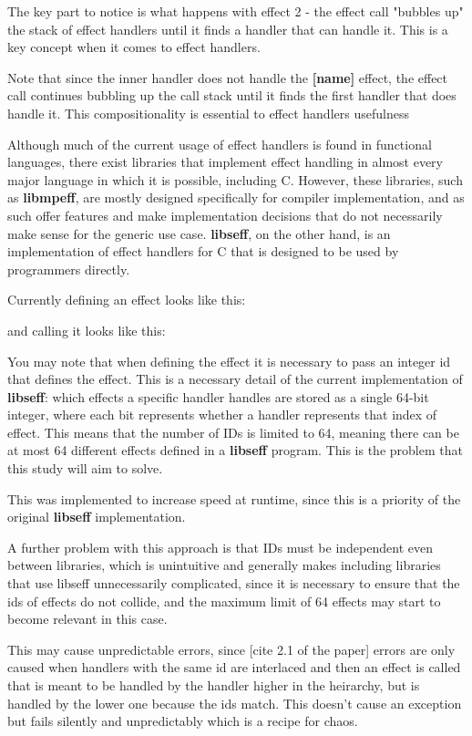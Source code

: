 \documentclass{article}
\begin{document}
The key part to notice is what happens with effect 2 - the effect call "bubbles up" the stack of effect handlers until it finds a handler that can handle it. This is a key concept when it comes to effect handlers.

Note that since the inner handler does not handle the \textbf{[name]} effect, the effect call continues bubbling up the call stack until it finds the first handler that does handle it. This compositionality is essential to effect handlers usefulness %









Although much of the current usage of effect handlers is found in functional languages, there exist libraries that implement effect handling in almost every major language in which it is possible, including C. However, these libraries, such as \textbf{libmpeff}, are mostly designed specifically for compiler implementation, and as such offer features and make implementation decisions that do not necessarily make sense for the generic use case.\cite{libmprompt} \textbf{libseff}, on the other hand, is an implementation of effect handlers for C that is designed to be used by programmers directly.\cite{libseff_paper}

Currently defining an effect looks like this: %

and calling it looks like this: %

You may note that when defining the effect it is necessary to pass an integer id that defines the effect. This is a necessary detail of the current implementation of \textbf{libseff}: which effects a specific handler handles are stored as a single 64-bit integer, where each bit represents whether a handler represents that index of effect. This means that the number of IDs is limited to 64, meaning there can be at most 64 different  effects defined in a \textbf{libseff} program. This is the problem that this study will aim to solve.

This was implemented to increase speed at runtime, since this is a priority of the original \textbf{libseff} implementation. %

A further problem with this approach is that IDs must be independent even between libraries, which is unintuitive and generally makes including libraries that use libseff unnecessarily complicated, since it is necessary to ensure that the ids of effects do not collide, and the maximum limit of 64 effects may start to become relevant in this case.

This may cause unpredictable errors, since [cite 2.1 of the paper] errors are only caused when handlers with the same id are interlaced and then an effect is called that is meant to be handled by the handler higher in the heirarchy, but is handled by the lower one because the ids match. This doesn't cause an exception but fails silently and unpredictably which is a recipe for chaos. %



\end{document}
